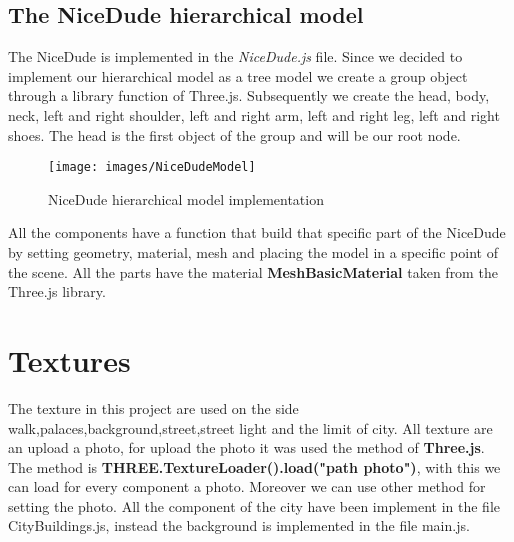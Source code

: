 \documentclass[a4paper, 11pt, titlepage]{report}
\begin{document}
	\section{The NiceDude hierarchical model}
		The NiceDude is implemented in the \emph{NiceDude.js} file. Since we decided to implement our hierarchical model as a tree model we create a group object through a library function of Three.js. Subsequently we create the head, body, neck, left and right shoulder, left and right arm, left and right leg, left and right shoes. The head is the first object of the group and will be our root node. 
		\begin{figure}[h!]
			\centering
			\texttt{[image: images/NiceDudeModel]}
			\caption{NiceDude hierarchical model implementation}
		\end{figure}
		All the components have a function that build that specific part of the NiceDude by setting geometry, material, mesh and placing the model in a specific point of the scene. All the parts have the material \textbf{MeshBasicMaterial} taken from the Three.js library.

\chapter{Textures}
	The texture in this project are used on the side walk,palaces,background,street,street light and the limit of city. All texture are an upload a photo, for upload the photo it was used the method of \textbf{Three.js}. The method is \textbf{THREE.TextureLoader().load("path photo")},  with this we can load for every component a photo. Moreover we can use other method for setting the photo. All the component of the city have been implement in the file CityBuildings.js, instead the background is implemented in the file main.js.
 
\end{document}
